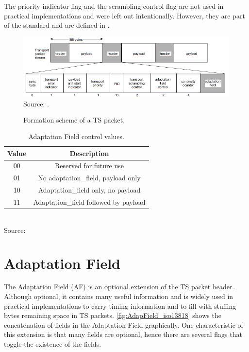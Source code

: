 \documentclass[
	12pt,				%
	openright,			%
	twoside,			%
	a4paper,			%
	brazil,
	french,				%
	english
	]{abntex2}
\begin{document}
The priority indicator flag and the scrambling control flag are not used in practical implementations and were left out intentionally. However, they are part of the standard and are defined in .
 
\begin{figure}[!h]
\centering
\caption{Formation scheme of a TS packet.}
\includegraphics[width=1\linewidth]{figuras/TS_iso13818.png}
\\Source: .
\label{fig:TS_iso13818}
\end{figure}

\begin{table}[!h]
\caption{Adaptation Field control values.}
\begin{center}
\begin{tabular}{|c|c|}
\hline
Value & Description \\
\hline
00 & Reserved for future use\\
\hline
01 & No adaptation\hspace{0.1mm}\_\hspace{0.1mm}field, payload only\\
\hline
10 & Adaptation\hspace{0.1mm}\_\hspace{0.1mm}field only, no payload\\
\hline
11 & Adaptation\hspace{0.1mm}\_\hspace{0.1mm}field followed by payload\\
\hline
\end{tabular}
\label{tab_adapataion_field}
\\Source: 
\end{center}
\end{table}

\section{Adaptation Field}

The Adaptation Field (AF) is an optional extension of the TS packet header. Although optional, it contains many useful information and is widely used in practical implementations to carry timing information and to fill with stuffing bytes remaining space in TS packets. \autoref{fig:AdapField_iso13818} shows the concatenation of fields in the Adaptation Field graphically. One characteristic of this extension is that many fields are optional, hence there are several flags that toggle the existence of the fields.
\end{document}
